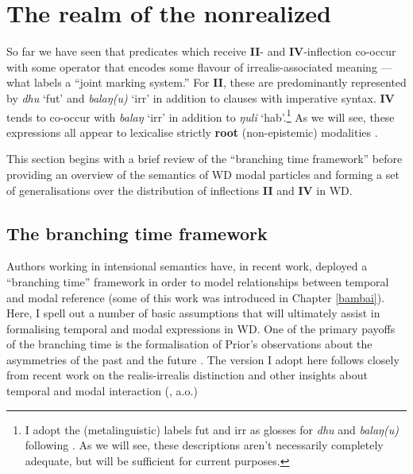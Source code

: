 \section{The realm of the nonrealized}
So far we have seen that predicates which receive \textbf{II}- and \textbf{IV}-inflection co-occur with some operator that encodes some flavour of irrealis-associated meaning --- what \citet[145]{Palmer2001} labels a ``joint marking system.'' For \textbf{II}, these are predominantly represented by \textit{dhu} `\gls{fut}' and \textit{balaŋ(u)} `\gls{irr}' in addition to clauses with imperative syntax. \textbf{IV} tends to co-occur with \textit{balaŋ} `\gls{irr}' in addition to \textit{ŋuli} `\gls{hab}'.\footnote{I adopt the (metalinguistic) labels \gls{fut} and \gls{irr} as glosses for \textit{dhu} and \textit{balaŋ(u)} following \citet{Wilkinson1991}. As we will see, these descriptions aren't necessarily completely adequate, but will be sufficient for current purposes.} As we will see, these expressions all appear to lexicalise strictly \textbf{root} (non-epistemic) modalities \citep[contra][123]{VanderWal1992}.

This section begins with a brief review of the ``branching time framework'' before providing an overview of the semantics of WD modal particles and forming a set of generalisations over the distribution of inflections \textbf{II} and \textbf{IV} in WD.



\subsection{The branching time framework}\label{BT-fwk}

Authors working in intensional semantics have, in recent work, deployed a ``branching time'' framework in order to model relationships between temporal and modal reference (some of this work was introduced in Chapter \ref{bambai}). Here, I spell out a number of basic assumptions that will ultimately assist in formalising temporal and modal expressions in WD. One of the primary payoffs of the branching time is the formalisation of Prior's observations about the asymmetries of the past and the future \citep[see also][]{Copeland2020,Dowty1977,Thomason1970,Thomason1984}. The version I adopt here follows closely from recent work on the realis-irrealis distinction \citep{VonPrince2019,Krifka2016} and other insights about temporal and modal interaction (\citealp[e.g.][]{Condoravdi2002,Ippolito2013}, a.o.)


